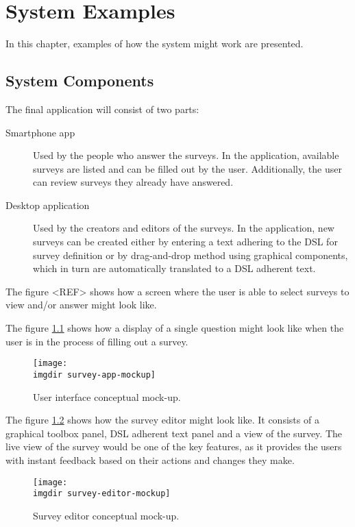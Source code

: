 \chapter{System Examples}
\label{chap:examples}
In this chapter, examples of how the system might work are presented.

\section{System Components}
\label{sec:systemcomponents}
The final application will consist of two parts: 

\begin{description}
\item[Smartphone app] Used by the people who answer the surveys. In the application, available surveys are listed and can be filled out by the user. Additionally, the user can review surveys they already have answered.
\item[Desktop application] Used by the creators and editors of the surveys. In the application, new surveys can be created either by entering a text adhering to the DSL for survey definition or by drag-and-drop method using graphical components, which in turn are automatically translated to a DSL adherent text.
\end{description}

The figure <REF> shows how a screen where the user is able to select surveys to view and/or answer might look like.

The figure \ref {fig:survey-app-mockup} shows how a display of a single question might look like when the user is in the process of filling out a survey.
\begin{figure}[!ht]
  \centering
  \texttt{[image: \\imgdir survey-app-mockup]}
  \caption{User interface conceptual mock-up.}
  \label{fig:survey-app-mockup}
\end{figure}

The figure \ref{fig:survey-editor-mockup} shows how the survey editor might look like. It consists of a graphical toolbox panel, DSL adherent text panel and a view of the survey. The live view of the survey would be one of the key features, as it provides the users with instant feedback based on their actions and changes they make.

\begin{figure}[!ht]
  \centering
  \texttt{[image: \\imgdir survey-editor-mockup]}
  \caption{Survey editor conceptual mock-up.}
  \label{fig:survey-editor-mockup}
\end{figure}

